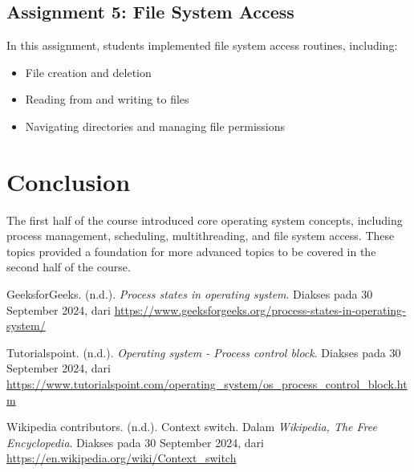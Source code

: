 \documentclass[12pt]{article}
\begin{document}
\subsection{Assignment 5: File System Access}
In this assignment, students implemented file system access routines, including:
\begin{itemize}
    \item File creation and deletion
    \item Reading from and writing to files
    \item Navigating directories and managing file permissions
\end{itemize}

\section{Conclusion}
The first half of the course introduced core operating system concepts, including process management, scheduling, multithreading, and file system access. These topics provided a foundation for more advanced topics to be covered in the second half of the course.


\begin{thebibliography}{}

\bibitem{}
GeeksforGeeks. (n.d.). \textit{Process states in operating system}. Diakses pada 30 September 2024, dari \url{https://www.geeksforgeeks.org/process-states-in-operating-system/}

\bibitem{}
Tutorialspoint. (n.d.). \textit{Operating system - Process control block}. Diakses pada 30 September 2024, dari \url{https://www.tutorialspoint.com/operating_system/os_process_control_block.htm}

\bibitem{}
Wikipedia contributors. (n.d.). Context switch. Dalam \textit{Wikipedia, The Free Encyclopedia}. Diakses pada 30 September 2024, dari \url{https://en.wikipedia.org/wiki/Context_switch}

\end{thebibliography}
\end{document}
